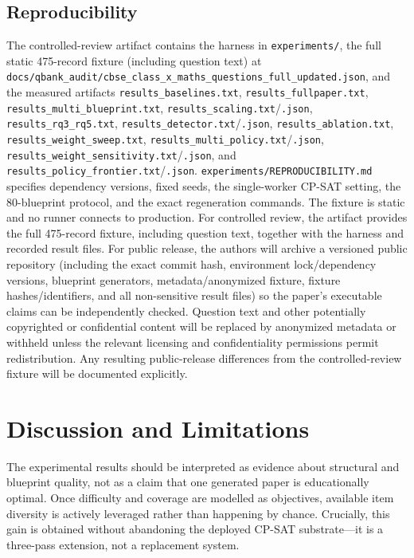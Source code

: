 \documentclass[runningheads]{llncs}
\begin{document}
\subsection{Reproducibility}
The controlled-review artifact contains the harness in \texttt{experiments/}, the full static 475-record fixture (including question text) at \texttt{docs/qbank\_audit/cbse\_class\_x\_maths\_questions\_full\_updated.json}, and the measured artifacts \texttt{results\_baselines.txt}, \texttt{results\_fullpaper.txt}, \texttt{results\_multi\_blueprint.txt}, \texttt{results\_scaling.txt}/\texttt{.json}, \texttt{results\_rq3\_rq5.txt}, \texttt{results\_detector.txt}/\texttt{.json}, \texttt{results\_ablation.txt}, \texttt{results\_weight\_sweep.txt}, \texttt{results\_multi\_policy.txt}/\texttt{.json}, \texttt{results\_weight\_sensitivity.txt}/\texttt{.json}, and \texttt{results\_policy\_frontier.txt}/\texttt{.json}.
\texttt{experiments/REPRODUCIBILITY.md} specifies dependency versions, fixed seeds, the single-worker CP-SAT setting, the 80-blueprint protocol, and the exact regeneration commands.
The fixture is static and no runner connects to production. For controlled review, the artifact provides the full 475-record fixture, including question text, together with the harness and recorded result files. For public release, the authors will archive a versioned public repository (including the exact commit hash, environment lock/dependency versions, blueprint generators, metadata/anonymized fixture, fixture hashes/identifiers, and all non-sensitive result files) so the paper's executable claims can be independently checked. Question text and other potentially copyrighted or confidential content will be replaced by anonymized metadata or withheld unless the relevant licensing and confidentiality permissions permit redistribution. Any resulting public-release differences from the controlled-review fixture will be documented explicitly.

\section{Discussion and Limitations}
\label{sec:discussion}

The experimental results should be interpreted as evidence about structural and blueprint quality, not as a claim that one generated paper is educationally optimal.
Once difficulty and coverage are modelled as objectives, available item diversity is actively leveraged rather than happening by chance.
Crucially, this gain is obtained without abandoning the deployed CP-SAT substrate---it is a three-pass extension, not a replacement system.
\end{document}
